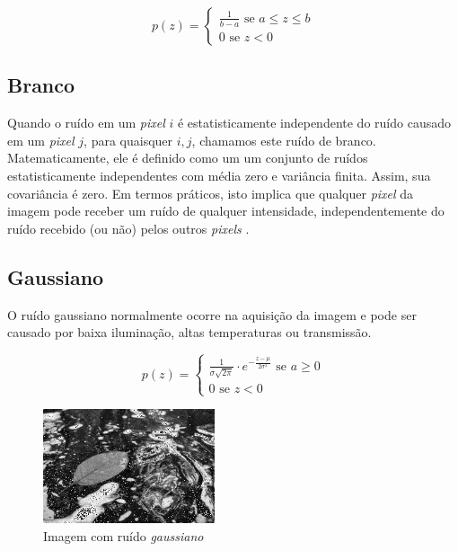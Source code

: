 \documentclass[10pt,a4paper]{article}
\newcommand{\pixel}{\textit{pixel} }
\newcommand{\pixels}{\textit{pixels} }
\begin{document}
\begin{equation}
p(z) = \left\{
    \begin{array}{l}
        \frac{1}{b - a} \text{ se } a \le z \le b \\
        0 \text{ se } z < 0
    \end{array}\right.
\end{equation}

\subsection{Branco}
Quando o ruído em um \pixel $i$ é estatisticamente independente do ruído causado em um \pixel $j$, para quaisquer $i,j$, chamamos este ruído de branco. Matematicamente, ele é definido como um um conjunto de ruídos estatisticamente independentes com média zero e variância finita. Assim, sua covariância é zero. Em termos práticos, isto implica que qualquer \pixel da imagem pode receber um ruído de qualquer intensidade, independentemente do ruído recebido (ou não) pelos outros \pixels.

\subsection{Gaussiano}
O ruído gaussiano normalmente ocorre na aquisição da imagem e pode ser causado por baixa iluminação, altas temperaturas ou transmissão.

\begin{equation}
p(z) = \left\{
    \begin{array}{l}
        \frac{1}{\sigma \sqrt{2 \pi}} \cdot e^{-\frac{z - \mu}{2 \sigma^{2}}} \text{ se } a \ge 0 \\
        0 \text{ se } z < 0
    \end{array}\right.
\end{equation}

\begin{figure}[!ht]
    \centering
    \includegraphics[width=0.45\textwidth]{dst_ga.jpg}
    \caption{Imagem com ruído \textit{gaussiano}}
    \label{fig:gauss}
\end{figure}
\end{document}
